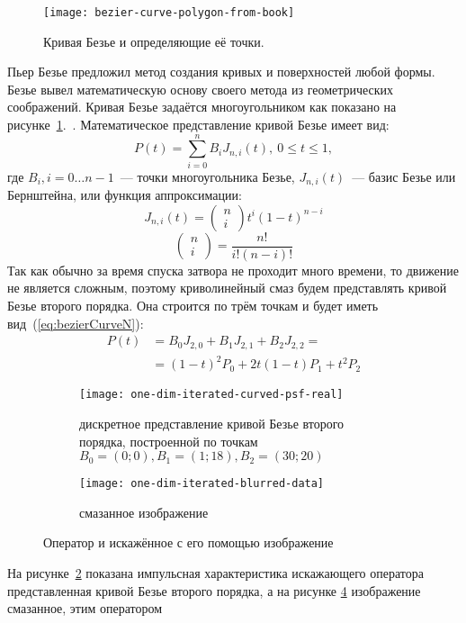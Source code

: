 \begin{figure}[h!]
	\centering\texttt{[image: bezier-curve-polygon-from-book]}
	\caption{Кривая Безье и определяющие её точки.}
	\label{fig:bezierPolygon}
\end{figure}
Пьер Безье предложил метод создания кривых и поверхностей любой формы. Безье вывел математическую основу своего метода из геометрических соображений. Кривая Безье задаётся многоугольником как показано на рисунке~\ref{fig:bezierPolygon}.~\cite{mathBasicsOfCopmuterGraphics}.
Математическое представление кривой Безье имеет вид:
\begin{equation}
P(t) = \sum_{i=0}^{n} B_i J_{n,i}(t),\ 0\leq t \leq 1,
\label{eq:bezierCurveN}
\end{equation}
где $B_i, i=0\dots n-1$~--- точки многоугольника Безье, $J_{n,i}(t)$~--- базис Безье или Бернштейна, или функция аппроксимации:
\begin{equation*}
J_{n,i}(t) = \begin{pmatrix}
n \\ i
\end{pmatrix} t^i (1-t)^{n-i}
\end{equation*}
\begin{equation*}
\begin{pmatrix}
n \\ i
\end{pmatrix} = \frac{n!}{i!(n-i)!}
\end{equation*}
Так как обычно за время спуска затвора не проходит много времени, то движение не является сложным, поэтому криволинейный смаз будем представлять кривой Безье второго порядка. Она строится по трём точкам и будет иметь вид~(\ref{eq:bezierCurveN}):
\begin{equation}
	\begin{aligned}
	P(t) & = B_0 J_{2,0} + B_1 J_{2,1} + B_2 J_{2,2} = \\
		 & = (1-t)^2 P_0 + 2t(1-t)P_1+t^2 P_2
	\end{aligned}
	\label{eq:bezierCurve2}
\end{equation}
\begin{figure}[h!]
	\begin{subfigure}[b]{0.5\textwidth}
		\texttt{[image: one-dim-iterated-curved-psf-real]}
		\caption{дискретное представление кривой Безье второго порядка, построенной по точкам $B_0=(0; 0), B_1=(1; 18), B_2=(30; 20)$}
		\label{fig:curvedPsf}
	\end{subfigure}
	\begin{subfigure}[b]{0.5\textwidth}
		\texttt{[image: one-dim-iterated-blurred-data]}
		\caption{смазанное изображение}
		\label{fig:liftingCurvedBlurred}
	\end{subfigure}
	\caption{Оператор и искажённое с его помощью изображение}
\end{figure}
На рисунке~\ref{fig:curvedPsf} показана импульсная характеристика искажающего оператора представленная кривой Безье второго порядка, а на рисунке \ref{fig:liftingCurvedBlurred} изображение смазанное, этим оператором

